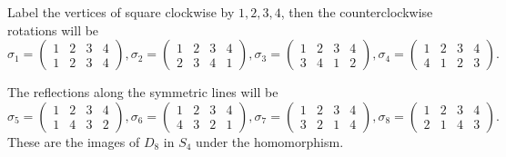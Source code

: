\begin{solution}
Label the vertices of square clockwise by $1,2,3,4$, then the counterclockwise rotations will be 
$$\sigma_1 = \left(
        \begin{matrix}  
        1 & 2 & 3 & 4\\     
    	1 & 2 & 3 & 4  
        \end{matrix}
        \right), \sigma_2 = \left(
        \begin{matrix}  
        1 & 2 & 3 & 4\\     
    	2 & 3 & 4 & 1  
        \end{matrix}
        \right), \sigma_3 = \left(
        \begin{matrix}  
        1 & 2 & 3 & 4\\     
    	3 & 4 & 1 & 2  
        \end{matrix}
        \right), \sigma_4 = \left(
        \begin{matrix}  
        1 & 2 & 3 & 4\\     
    	4 & 1 & 2 & 3  
        \end{matrix}
        \right).$$
        
        The reflections along the symmetric lines will be
        $$\sigma_5 = \left(
        \begin{matrix}  
        1 & 2 & 3 & 4\\     
    	1 & 4 & 3 & 2  
        \end{matrix}
        \right), \sigma_6 = \left(
        \begin{matrix}  
        1 & 2 & 3 & 4\\     
    	4 & 3 & 2 & 1  
        \end{matrix}
        \right), \sigma_7 = \left(
        \begin{matrix}  
        1 & 2 & 3 & 4\\     
    	3 & 2 & 1 & 4  
        \end{matrix}
        \right), \sigma_8 = \left(
        \begin{matrix}  
        1 & 2 & 3 & 4\\     
    	2 & 1 & 4 & 3  
        \end{matrix}
        \right).$$
 These are the images of $D_8$ in $S_4$ under the homomorphism.          
\end{solution}

